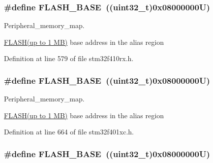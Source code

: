 \subsubsection[{\texorpdfstring{F\+L\+A\+S\+H\+\_\+\+B\+A\+SE}{FLASH_BASE}}]{\setlength{\rightskip}{0pt plus 5cm}\#define F\+L\+A\+S\+H\+\_\+\+B\+A\+SE~((uint32\+\_\+t)0x08000000\+U)}\hypertarget{group___peripheral__registers__structures_ga23a9099a5f8fc9c6e253c0eecb2be8db}{}\label{group___peripheral__registers__structures_ga23a9099a5f8fc9c6e253c0eecb2be8db}


Peripheral\+\_\+memory\+\_\+map. 

\hyperlink{group___peripheral__declaration_ga844ea28ba1e0a5a0e497f16b61ea306b}{F\+L\+A\+S\+H(up to 1 M\+B)} base address in the alias region 

Definition at line 579 of file stm32f410rx.\+h.

\subsubsection[{\texorpdfstring{F\+L\+A\+S\+H\+\_\+\+B\+A\+SE}{FLASH_BASE}}]{\setlength{\rightskip}{0pt plus 5cm}\#define F\+L\+A\+S\+H\+\_\+\+B\+A\+SE~((uint32\+\_\+t)0x08000000\+U)}\hypertarget{group___peripheral__registers__structures_ga23a9099a5f8fc9c6e253c0eecb2be8db}{}\label{group___peripheral__registers__structures_ga23a9099a5f8fc9c6e253c0eecb2be8db}


Peripheral\+\_\+memory\+\_\+map. 

\hyperlink{group___peripheral__declaration_ga844ea28ba1e0a5a0e497f16b61ea306b}{F\+L\+A\+S\+H(up to 1 M\+B)} base address in the alias region 

Definition at line 664 of file stm32f401xc.\+h.

\subsubsection[{\texorpdfstring{F\+L\+A\+S\+H\+\_\+\+B\+A\+SE}{FLASH_BASE}}]{\setlength{\rightskip}{0pt plus 5cm}\#define F\+L\+A\+S\+H\+\_\+\+B\+A\+SE~((uint32\+\_\+t)0x08000000\+U)}\hypertarget{group___peripheral__registers__structures_ga23a9099a5f8fc9c6e253c0eecb2be8db}{}\label{group___peripheral__registers__structures_ga23a9099a5f8fc9c6e253c0eecb2be8db}



